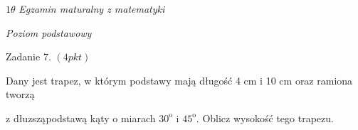 \documentclass[a4paper,12pt]{article}
\begin{document}
$ 1\theta$ {\it Egzamin maturalny z matematyki}

{\it Poziom podstawowy}

Zadanie 7. $(4pkt)$

Dany jest trapez, w którym podstawy mają długość 4 cm i 10 cm oraz ramiona tworzą

z dłuzsząpodstawą kąty o miarach $30^{\mathrm{o}}$ i $45^{\mathrm{o}}$. Oblicz wysokość tego trapezu.
\end{document}
